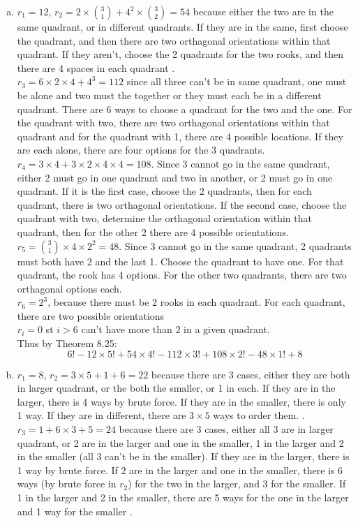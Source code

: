 \documentclass[12pt,letterpaper,boxed]{hmcpset}
\begin{document}
\begin{solution}
\begin{enumerate}[(a)]
\item $r_1 = 12$, $r_2 = 2\times \binom{3}{1} + 4^2\times \binom{3}{2} =54$ because either the two are in the same quadrant, or in different quadrants. If they are in the same, first choose the quadrant, and then there are two orthagonal orientations within that quadrant. If they aren't, choose the 2 quadrants for the two rooks, and then there are 4 spaces in each quadrant .\\ $r_3 = 6\times2\times4 + 4^3=112$ since all three can't be in same quadrant, one must be alone and two must the together or they must each be in a different quadrant. There are 6 ways to choose a quadrant for the two and the one. For the quadrant with two, there are two orthagonal orientations within that quadrant and for the quadrant with 1, there are 4 possible locations. If they are each alone, there are four options for the 3 quadrants. \\
 $r_4 = 3\times 4 + 3 \times 2 \times 4 \times 4 = 108$. Since 3 cannot go in the same quadrant, either 2 must go in one quadrant and two in another, or 2 must go in one quadrant. If it is the first case, choose the 2 quadrants, then for each quadrant, there is two orthagonal orientations. If the second case, choose the quadrant with two, determine the orthagonal orientation within that quadrant, then for the other 2 there are 4 possible orientations.\\
  $r_5 = \binom{3}{1}\times 4\times 2^2 =48$. Since 3 cannot go in the same quadrant, 2 quadrants must both have 2 and the last 1. Choose the quadrant to have one. For that quadrant, the rook has 4 options. For the other two quadrants, there are two orthagonal options each.\\ $r_6 = 2^3$, because there must be 2 rooks in each quadrant. For each quadrant, there are two possible orientations\\
$r_i=0$ st $i>6$ can't have more than 2 in a given quadrant.\\
Thus by Theorem 8.25:
$$\boxed{6!-12\times5! +54\times 4! -112\times 3! + 108\times 2! -48\times 1! + 8}$$
\item $r_1 = 8$, $r_2 = 3\times 5 + 1 + 6 =22$ because there are 3 cases, either they are both in larger quadrant, or the both the smaller, or 1 in each. If they are in the larger, there is 4 ways by brute force. If they are in the smaller, there is only 1 way. If they are in different, there are $3 \times 5$ ways to order them.  .\\ $r_3 = 1+6\times 3 + 5 = 24$  because there are 3 cases, either all 3 are in larger quadrant, or 2 are in the larger and one in the smaller, 1 in the larger and 2 in the smaller (all 3 can't be in the smaller). If they are in the larger, there is 1 way by brute force. If 2 are in the larger and one in the smaller, there is 6 ways (by brute force in $r_2$) for the two in the larger, and 3 for the smaller. If 1 in the larger and 2 in the smaller, there are 5 ways for the one in the larger and 1 way for the smaller  .\\

\end{enumerate}
\end{solution}
\end{document}
